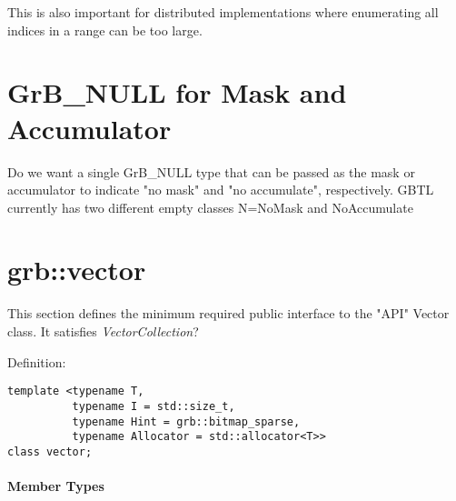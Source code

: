 This is also important for distributed implementations where enumerating all indices in a range can be too large.

\section{{\sf GrB\_NULL} for Mask and Accumulator}
\label{Sec:NoMaskNoAccum}

Do we want a single {\sf GrB\_NULL} type that can be passed as the mask or accumulator 
to indicate "no mask" and "no accumulate", respectively.  GBTL currently has two
different empty classes N={\sf NoMask} and {\sf NoAccumulate}

\section{\sf grb::vector}
\label{Sec:Vectors}

This section defines the minimum required public interface to the "API"  Vector class.  It satisfies \textit{VectorCollection}?

Definition:

\begin{verbatim}
template <typename T,
          typename I = std::size_t,
          typename Hint = grb::bitmap_sparse,
          typename Allocator = std::allocator<T>>
class vector;
\end{verbatim}

\paragraph{Member Types}

